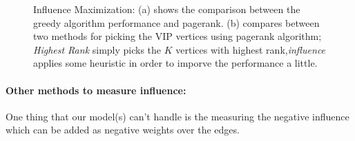 \begin{figure}[!tbh]
\centering        
   
   
   \caption { Influence Maximization: (a) shows the comparison between the greedy algorithm performance and pagerank. (b) compares between two methods for picking the VIP vertices using pagerank algorithm; {\itshape{Highest Rank}} simply picks the $K$ vertices with highest rank,{\itshape{influence}} applies some heuristic in order to imporve the performance a little.}
   \label{fig:inf2}
\end{figure}
\paragraph{Other methods to measure influence:} One thing that our model(s) can't handle is the measuring the negative influence which can be added as negative weights over the edges. 
